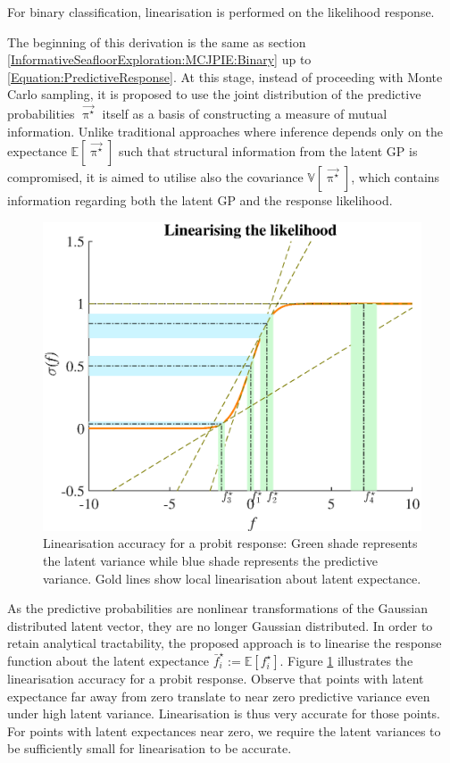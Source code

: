			For binary classification, linearisation is performed on the likelihood response.
					
			The beginning of this derivation is the same as section \ref{InformativeSeafloorExploration:MCJPIE:Binary} up to \eqref{Equation:PredictiveResponse}. At this stage, instead of proceeding with Monte Carlo sampling, it is proposed to use the joint distribution of the predictive probabilities $\vec{\uppi^{\star}}$ itself as a basis of constructing a measure of mutual information. Unlike traditional approaches where inference depends only on the expectance $\mathbb{E}[\vec{\uppi^{\star}}]$ such that structural information from the latent GP is compromised, it is aimed to utilise also the covariance $\mathbb{V}[\vec{\uppi^{\star}}]$, which contains information regarding both the latent GP and the response likelihood.
		
			\begin{figure}[!htbp]
				\centering
					\includegraphics[width = 0.6\linewidth]{Figures/linearisation.eps}
				\caption{Linearisation accuracy for a probit response: Green shade represents the latent variance while blue shade represents the predictive variance. Gold lines show local linearisation about latent expectance.}
				\label{Figure:Linearisation}
			\end{figure}
				
			As the predictive probabilities are nonlinear transformations of the Gaussian distributed latent vector, they are no longer Gaussian distributed. In order to retain analytical tractability, the proposed approach is to linearise the response function about the latent expectance $\bar{f}^{\star}_{i} := \mathbb{E}[f^{\star}_{i}]$. Figure \ref{Figure:Linearisation} illustrates the linearisation accuracy for a probit response. Observe that points with latent expectance far away from zero translate to near zero predictive variance even under high latent variance. Linearisation is thus very accurate for those points. For points with latent expectances near zero, we require the latent variances to be sufficiently small for linearisation to be accurate.
			
